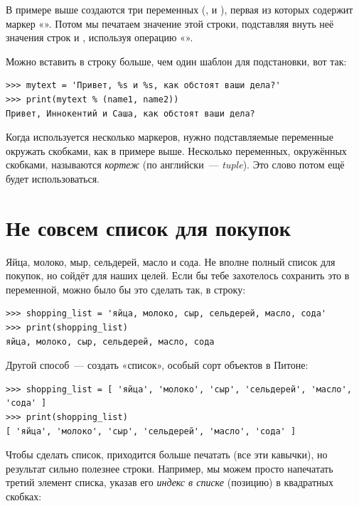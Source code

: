 В примере выше создаются три переменных (,  и ), первая из которых содержит маркер «». Потом мы печатаем значение этой строки, подставляя внуть неё значения строк  и , используя операцию «\code{\%}».

Можно вставить в строку больше, чем один шаблон для подстановки, вот так:

\begin{listing}
\begin{verbatim}
>>> mytext = 'Привет, %s и %s, как обстоят ваши дела?'
>>> print(mytext % (name1, name2))
Привет, Иннокентий и Саша, как обстоят ваши дела?
\end{verbatim}
\end{listing}

Когда используется несколько маркеров, нужно подставляемые переменные окружать скобками, как в примере выше. Несколько переменных, окружённых скобками, называются \emph{кортеж} (по английски — \emph{tuple}). Это слово потом ещё будет использоваться.

\section{Не совсем список для покупок}

Яйца, молоко, мыр, сельдерей, масло и сода. Не вполне полный список для покупок, но сойдёт для наших целей. Если бы тебе захотелось сохранить это в переменной, можно было бы это сделать так, в строку:

\begin{listing}
\begin{verbatim}
>>> shopping_list = 'яйца, молоко, сыр, сельдерей, масло, сода'
>>> print(shopping_list)
яйца, молоко, сыр, сельдерей, масло, сода
\end{verbatim}
\end{listing}

Другой способ — создать «список», особый сорт объектов в Питоне:

\begin{listing}
\begin{verbatim}
>>> shopping_list = [ 'яйца', 'молоко', 'сыр', 'сельдерей', 'масло', 'сода' ]
>>> print(shopping_list)
[ 'яйца', 'молоко', 'сыр', 'сельдерей', 'масло', 'сода' ]
\end{verbatim}
\end{listing}

Чтобы сделать список, приходится больше печатать (все эти кавычки), но результат сильно полезнее строки. Например, мы можем просто напечатать третий элемент списка, указав его \emph{индекс в списке} (позицию) в квадратных скобках:

